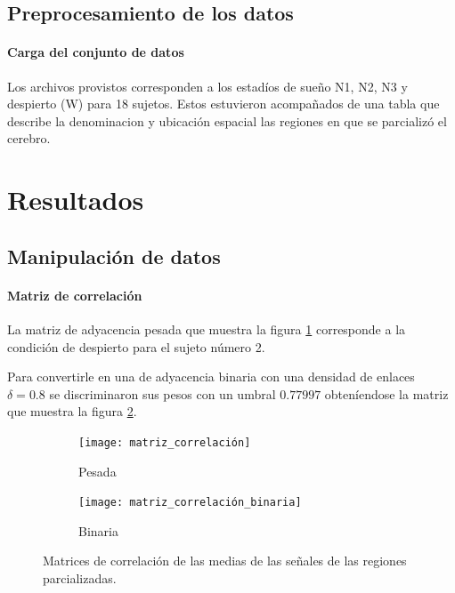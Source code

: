 \documentclass{article}
\begin{document}
\subsection{Preprocesamiento de los datos}

\paragraph{Carga del conjunto de datos} 
Los archivos provistos corresponden a los estadíos de sueño N1, N2, N3 y despierto (W) para 18 sujetos.
Estos estuvieron acompañados de una tabla que describe la denominacion y  ubicación espacial las regiones en que se parcializó el cerebro.



\section{Resultados}

\subsection{Manipulación de datos}

\paragraph{Matriz de correlación}
La matriz de adyacencia pesada que muestra la figura \ref{fg:matriz_correlación_pesada} corresponde a la condición de despierto para el sujeto número 2.

Para convertirle en una de adyacencia binaria con una densidad de enlaces \(\delta = 0.8\) se discriminaron sus pesos con un umbral \(0.77997\) obteníendose la matriz que muestra la figura \ref{fg:matriz_correlación_binaria}.

\begin{figure}[ht]
	\centering
	\begin{subfigure}[b]{0.4\textwidth}
		\texttt{[image: matriz\_correlación]}
		\caption{Pesada}
		\label{fg:matriz_correlación_pesada}
	\end{subfigure}
	\begin{subfigure}[b]{0.425\textwidth}
		\texttt{[image: matriz\_correlación\_binaria]}
		\caption{Binaria}
		\label{fg:matriz_correlación_binaria}
	\end{subfigure}
	\caption{Matrices de correlación de las medias de las señales de las regiones parcializadas.
	}
	\label{fg:matriz_correlación}
\end{figure}
\end{document}
